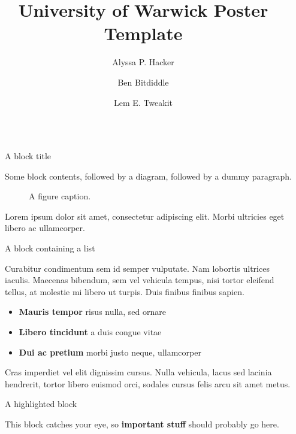 \documentclass[final]{beamer}
\title{University of Warwick Poster Template}
\author{Alyssa P. Hacker \inst{1} \and Ben Bitdiddle \inst{2} \and Lem E. Tweakit \inst{2}}
\institute[shortinst]{\inst{1} Some Institute \samelineand \inst{2} Another Institute}
\newlength{\sepwidth}
\newlength{\colwidth}
\newcommand{\separatorcolumn}{\begin{column}{\sepwidth}\end{column}}
\begin{document}
\begin{frame}[t]
\begin{columns}[t]
\separatorcolumn

\begin{column}{\colwidth}

  \begin{block}{A block title}

    Some block contents, followed by a diagram, followed by a dummy paragraph.

    \begin{figure}
      \centering
      \caption{A figure caption.}
    \end{figure}

    Lorem ipsum dolor sit amet, consectetur adipiscing elit. Morbi ultricies
    eget libero ac ullamcorper.

  \end{block}

  \begin{block}{A block containing a list}

    Curabitur condimentum sem id semper vulputate. Nam lobortis ultrices
    iaculis. Maecenas bibendum, sem vel vehicula tempus, nisi tortor eleifend
    tellus, at molestie mi libero ut turpis. Duis finibus finibus sapien.

    \begin{itemize}
      \item \textbf{Mauris tempor} risus nulla, sed ornare
      \item \textbf{Libero tincidunt} a duis congue vitae
      \item \textbf{Dui ac pretium} morbi justo neque, ullamcorper
    \end{itemize}

    Cras imperdiet vel elit dignissim cursus. Nulla vehicula, lacus sed lacinia
    hendrerit, tortor libero euismod orci, sodales cursus felis arcu sit amet
    metus.

  \end{block}

  \begin{coralblock}{A highlighted block}

    This block catches your eye, so \textbf{important stuff} should probably go
    here.


\end{coralblock}
\end{column}
\end{columns}
\end{frame}
\end{document}
